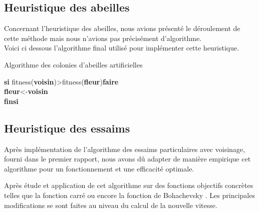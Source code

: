 \documentclass[12pt]{article}
\begin{document}
\subsection{Heuristique des abeilles}
Concernant l'heuristique des abeilles, nous avions présenté le déroulement de cette méthode mais nous n'avions pas précisément d'algorithme. \\
Voici ci dessous l'algorithme final utilisé pour implémenter cette heuristique.
\begin{algorithm}
 \caption{Algorithme des colonies d'abeilles artificielles}
 
 \begin{algorithmic}
        
       	 \indent \textbf{si} fitness(\textbf{voisin})>fitness(\textbf{fleur})\textbf{faire}\\
         	\indent \indent \textbf{fleur}<-\textbf{voisin}\\
         \textbf{finsi}
            	\indent {}
         	
      \ENDFOR
    \ENDFOR
 	
 \end{algorithmic}
\end{algorithm}
\subsection{Heuristique des essaims}
Après implémentation de l'algorithme des essaims particulaires avec voisinage, fourni dans le premier rapport, nous avons dû adapter de manière empirique cet algorithme pour un fonctionnement et une efficacité optimale.

     \newpage
    Après étude et application de cet algorithme sur des fonctions objectifs concrètes telles que la fonction carré ou encore la fonction de Bohachevsky \cite{fonctionsObjectifs}. Les principales modifications se sont faites au niveau du calcul de la nouvelle vitesse. 
   
\end{document}
